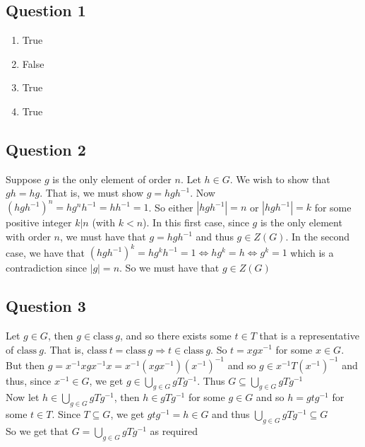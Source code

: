 \documentclass[letterpaper, 11pt]{article}
\newcommand{\1}{\mathds{1}}	%
\theoremstyle{definition}
\begin{document}
\subsection*{Question 1}
\begin{enumerate}[label=(\alph*)]
\item True
\item False
\item True
\item True
\end{enumerate}

\subsection*{Question 2}
Suppose $g$ is the only element of order $n$. Let $h \in G$. We wish to show that $gh = hg$. That is, we must show $g = hgh^{-1}$. Now $(hgh^{-1})^n = hg^nh^{-1} = hh^{-1}=1$. So either $|hgh^{-1}| = n$ or $|hgh^{-1}| = k$ for some positive integer $k | n$ (with $k < n$). In this first case, since $g$ is the only element with order $n$, we must have that $g = hgh^{-1}$ and thus $g \in Z(G)$. In the second case, we have that $(hgh^{-1})^k = hg^kh^{-1}=1 \iff hg^k=h \iff g^k=1$ which is a contradiction since $|g|=n$. So we must have that $g \in Z(G)$

\subsection*{Question 3}
Let $g \in G$, then $g \in \text{class} \ g$, and so there exists some $t \in T$ that is a representative of $\text{class} \ g$. That is, $\text{class} \ t = \text{class} \ g \Rightarrow t \in \text{class} \ g$. So $t = xgx^{-1}$ for some $x \in G$. But then $g = x^{-1} xgx^{-1} x = x^{-1} (xgx^{-1}) (x^{-1})^{-1}$ and so $g \in x^{-1}T(x^{-1})^{-1}$ and thus, since $x^{-1} \in G$, we get $g \in \bigcup \limits _{g \in G} gTg^{-1}$. Thus $G \subseteq \bigcup \limits _{g \in G} gTg^{-1}$ \\ 
Now let $h \in \bigcup \limits _{g \in G} gTg^{-1}$, then $h \in gTg^{-1}$ for some $g\in G$ and so $h = gtg^{-1}$ for some $t \in T$. Since $T \subseteq G$, we get $gtg^{-1}=h \in G$  and thus  $\bigcup \limits _{g \in G} gTg^{-1} \subseteq G$\\ So we get that $G = \bigcup \limits _{g \in G} gTg^{-1}$ as required
\end{document}
